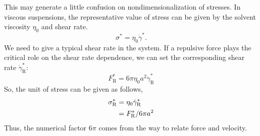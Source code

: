 \documentclass[fontsize=11pt]{scrartcl}
\begin{document}
This may generate a little confusion
on nondimensionalization of stresses.
%
In viscous suspensions,
the representative value of stress
can be given by the solvent viscosity $\eta_0$
and shear rate.
\begin{equation}
 \sigma^{\ast} = \eta_0 \dot{\gamma}^{\ast}.
\end{equation}
%
We need to give a typical shear rate in the system.
%
If a repulsive force plays
the critical role on the shear rate dependence,
we can set the corresponding shear rate $\dot{\gamma}^{\ast}_{\mathrm{R}}$:
\begin{equation}
 F_{\mathrm{R}}^{\ast} =
  6 \pi \eta_0 a^2 \dot{\gamma}^{\ast}_{\mathrm{R}}
\end{equation}
So, the unit of stress can be given as follows,
\begin{align}
 \sigma^{\ast}_{\mathrm{R}}
 &= \eta_0 \dot{\gamma}^{\ast}_{\mathrm{R}} \notag \\
  &=  F_{\mathrm{R}}^{\ast}/6\pi a^2
\end{align}
Thus, the numerical factor $6\pi$
comes from the way to relate force and velocity.
\end{document}
